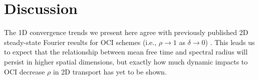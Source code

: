 







\section{Discussion}

The 1D convergence trends we present here agree with
previously published 2D steady-state Fourier results for OCI schemes %
(i.e., $\rho\rightarrow1$ as $\delta\rightarrow0$) \cite{rosa_cellwise_2013, man1994parallel}.
This leads us to expect that the relationship between mean free time and spectral radius will persist in higher spatial dimensions, 
but exactly how much dynamic impacts to OCI decrease $\rho$ in 2D transport has yet to be shown.

